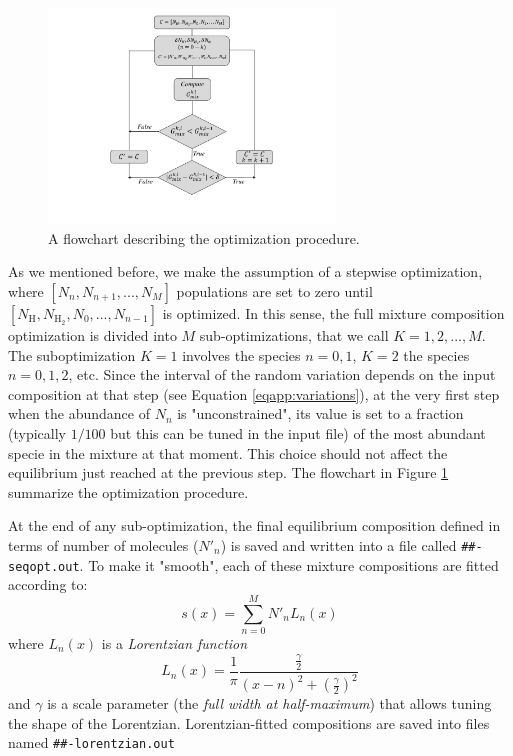 \documentclass[a4paper, 11pt, twoside]{book}
\begin{document}
\begin{figure}
\centering
\includegraphics[width=0.68\textwidth]{flowchart}
\caption{A flowchart describing the optimization procedure.}
\label{fig:flowchart}
\end{figure}

As we mentioned before, we make the assumption of a stepwise optimization, where $[N_n, N_{n+1}, ..., N_{M}]$ populations are set to zero until $[N_{\text{H}}, N_{\text{H}_2}, N_0, ..., N_{n-1}]$ is optimized. In this sense, the full mixture composition optimization is divided into $M$ sub-optimizations, that we call $K=1, 2, ..., M$. The suboptimization $K=1$ involves the species $n=0,1$, $K=2$ the species $n=0,1,2$, etc. Since the interval of the random variation depends on the input composition at that step (see Equation \eqref{eqapp:variations}), at the very first step when the abundance of $N_n$ is "unconstrained", its value is set to a fraction (typically $1/100$ but this can be tuned in the input file) of the most abundant specie in the mixture at that moment. This choice should not affect the equilibrium just reached at the previous step. The flowchart in Figure \ref{fig:flowchart} summarize the optimization procedure.

At the end of any sub-optimization, the final equilibrium composition defined in terms of number of molecules ($N'_n$) is saved and written into a file called \texttt{\#\#-seqopt.out}. To make it "smooth", each of these mixture compositions are fitted according to:
\begin{equation}
    s(x)=\sum_{n=0}^{M} N'_n L_n(x) \nonumber 
\end{equation}
where $L_n(x)$ is a \emph{Lorentzian function}
\begin{equation}
    L_n(x) = \frac{1}{\pi}\frac{\frac{\gamma}{2}}{(x-n)^2+(\frac{\gamma}{2})^2} \nonumber
\end{equation}
and $\gamma$ is a scale parameter (the \emph{full width at half-maximum}) that allows tuning the shape of the Lorentzian. Lorentzian-fitted compositions are saved into files named \texttt{\#\#-lorentzian.out}
\end{document}
